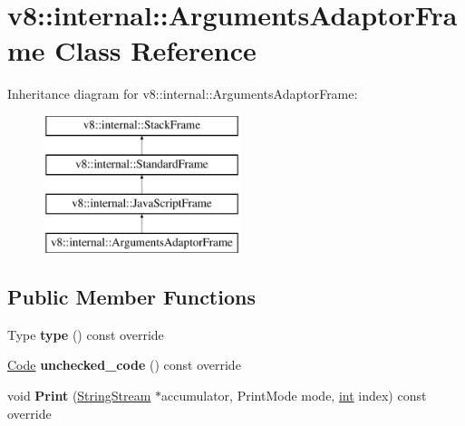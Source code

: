 \hypertarget{classv8_1_1internal_1_1ArgumentsAdaptorFrame}{}\section{v8\+:\+:internal\+:\+:Arguments\+Adaptor\+Frame Class Reference}
\label{classv8_1_1internal_1_1ArgumentsAdaptorFrame}
Inheritance diagram for v8\+:\+:internal\+:\+:Arguments\+Adaptor\+Frame\+:\begin{figure}[H]
\begin{center}
\leavevmode
\includegraphics[height=4.000000cm]{classv8_1_1internal_1_1ArgumentsAdaptorFrame}
\end{center}
\end{figure}
\subsection*{Public Member Functions}
\begin{DoxyCompactItemize}
\item 
\mbox{\label{classv8_1_1internal_1_1ArgumentsAdaptorFrame_aa4b71339840c7570df68929992ec9442}} 
Type {\bfseries type} () const override
\item 
\mbox{\label{classv8_1_1internal_1_1ArgumentsAdaptorFrame_a232f413f2394c98c7b7bda04987434f9}} 
\mbox{\hyperlink{classv8_1_1internal_1_1Code}{Code}} {\bfseries unchecked\+\_\+code} () const override
\item 
\mbox{\label{classv8_1_1internal_1_1ArgumentsAdaptorFrame_a39192f87d3e21f3bafb85c8a610b54aa}} 
void {\bfseries Print} (\mbox{\hyperlink{classv8_1_1internal_1_1StringStream}{String\+Stream}} $\ast$accumulator, Print\+Mode mode, \mbox{\hyperlink{classint}{int}} index) const override
\end{DoxyCompactItemize}
